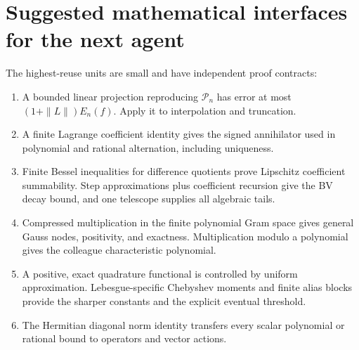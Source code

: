 \documentclass[11pt]{article}
\theoremstyle{remark}
\numberwithin{equation}{section}
\begin{document}
\section{Suggested mathematical interfaces for the next agent}
The highest-reuse units are small and have independent proof contracts:
\begin{enumerate}
\item A bounded linear projection reproducing $\mathcal P_n$ has error
at most $(1+\|L\|)E_n(f)$. Apply it to interpolation and truncation.
\item A finite Lagrange coefficient identity gives the signed annihilator
used in polynomial and rational alternation, including uniqueness.
\item Finite Bessel inequalities for difference quotients prove Lipschitz
coefficient summability. Step approximations plus coefficient recursion
give the BV decay bound, and one telescope supplies all algebraic tails.
\item Compressed multiplication in the finite polynomial Gram space
gives general Gauss nodes, positivity, and exactness. Multiplication
modulo a polynomial gives the colleague characteristic polynomial.
\item A positive, exact quadrature functional is controlled by uniform
approximation. Lebesgue-specific Chebyshev moments and finite alias
blocks provide the sharper constants and the explicit eventual threshold.
\item The Hermitian diagonal norm identity transfers every scalar
polynomial or rational bound to operators and vector actions.


\end{enumerate}
\end{document}
